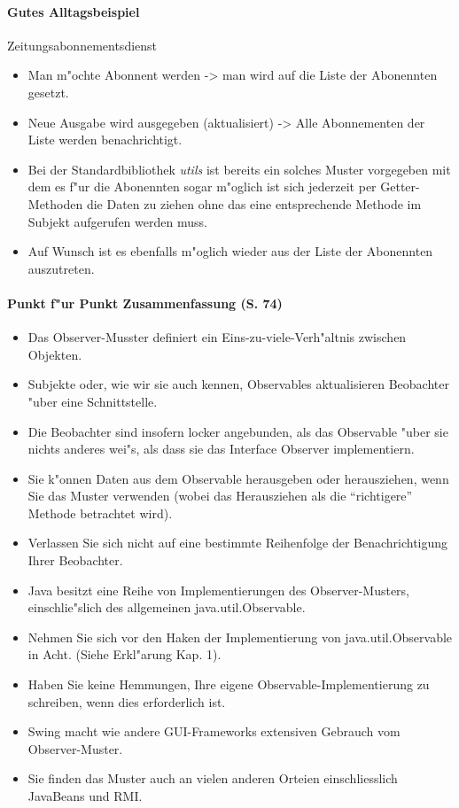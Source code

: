 \paragraph{Gutes Alltagsbeispiel} 
Zeitungsabonnementsdienst
\begin{itemize}
\item Man m"ochte Abonnent werden -> man wird auf die Liste der Abonennten gesetzt. 
\item Neue Ausgabe wird ausgegeben (aktualisiert) -> Alle Abonnementen der Liste werden benachrichtigt. 
\item Bei der Standardbibliothek \emph{utils} ist bereits ein solches Muster vorgegeben mit dem es f"ur die 
  Abonennten sogar m"oglich ist sich jederzeit per Getter-Methoden die Daten zu ziehen ohne das 
  eine entsprechende Methode im Subjekt aufgerufen werden muss.
\item Auf Wunsch ist es ebenfalls m"oglich wieder aus der Liste der Abonennten auszutreten. 
\end{itemize}

\paragraph{Punkt f"ur Punkt Zusammenfassung (S. 74)}
\begin{itemize}
\item Das Observer-Musster definiert ein Eins-zu-viele-Verh"altnis zwischen Objekten.
\item Subjekte oder, wie wir sie auch kennen, Observables aktualisieren Beobachter "uber eine 
  Schnittstelle.
\item Die Beobachter sind insofern locker angebunden, als das Observable "uber sie nichts anderes 
  wei"s, als dass sie das Interface Observer implementiern. 
\item Sie k"onnen Daten aus dem Observable herausgeben oder herausziehen, wenn Sie das Muster 
  verwenden (wobei das Herausziehen als die \enquote{richtigere} Methode betrachtet wird). 
\item Verlassen Sie sich nicht auf eine bestimmte Reihenfolge der Benachrichtigung Ihrer Beobachter. 
\item Java besitzt eine Reihe von Implementierungen des Observer-Musters, einschlie"slich des 
  allgemeinen java.util.Observable.
\item Nehmen Sie sich vor den Haken der Implementierung von java.util.Observable in Acht. (Siehe 
  Erkl"arung Kap. 1).
\item Haben Sie keine Hemmungen, Ihre eigene Observable-Implementierung zu schreiben, wenn dies 
  erforderlich ist.
\item Swing macht wie andere GUI-Frameworks extensiven Gebrauch vom Observer-Muster.
\item Sie finden das Muster auch an vielen anderen Orteien einschliesslich JavaBeans und RMI. 
\end{itemize}

